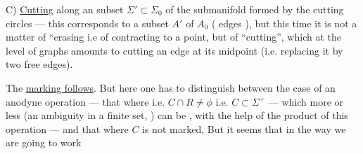 C) \uline{Cutting}  along an  subset
$\Sigma'\subset\Sigma_0$ of the submanifold formed by the cutting circles --- this corresponds to a subset $A'$ of $A_0$ ( edges ), but this time it is not a matter of ``erasing i.e of contracting to a point, but of ``cutting'', which at the level of graphs amounts to cutting an edge at its midpoint (i.e. replacing it by two free edges).

The \uline{marking follows}. 
But here one has to distinguish between the case of an anodyne operation  --- that
where 
 i.e. $C\cap R\ne\phi$ i.e. $C\subset\Sigma^+$ --- which more or less (an ambiguity in a finite set, \deleted{)} ) can be , with the help of the product of this operation --- and that where $C$ is not marked,
But it seems that in the way we are going to work
